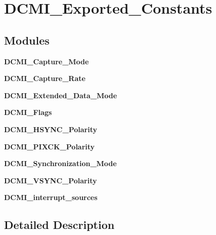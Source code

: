 \section{D\+C\+M\+I\+\_\+\+Exported\+\_\+\+Constants}
\label{group__DCMI__Exported__Constants}
\subsection*{Modules}
\begin{DoxyCompactItemize}
\item 
\textbf{ D\+C\+M\+I\+\_\+\+Capture\+\_\+\+Mode}
\item 
\textbf{ D\+C\+M\+I\+\_\+\+Capture\+\_\+\+Rate}
\item 
\textbf{ D\+C\+M\+I\+\_\+\+Extended\+\_\+\+Data\+\_\+\+Mode}
\item 
\textbf{ D\+C\+M\+I\+\_\+\+Flags}
\item 
\textbf{ D\+C\+M\+I\+\_\+\+H\+S\+Y\+N\+C\+\_\+\+Polarity}
\item 
\textbf{ D\+C\+M\+I\+\_\+\+P\+I\+X\+C\+K\+\_\+\+Polarity}
\item 
\textbf{ D\+C\+M\+I\+\_\+\+Synchronization\+\_\+\+Mode}
\item 
\textbf{ D\+C\+M\+I\+\_\+\+V\+S\+Y\+N\+C\+\_\+\+Polarity}
\item 
\textbf{ D\+C\+M\+I\+\_\+interrupt\+\_\+sources}
\end{DoxyCompactItemize}


\subsection{Detailed Description}
